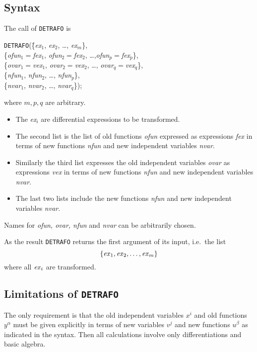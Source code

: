 \documentclass[12pt]{article}
\begin{document}
\subsection{Syntax}
The call of {\tt DETRAFO} is
\begin{tabbing}
{\tt DETRAFO}(\=\{{\it ex}$_1$, {\it ex}$_2$, \ldots , {\it ex}$_m$\}, \\
              \>\{{\it ofun}$_1=${\it fex}$_1$, {\it ofun}$_2=${\it fex}$_2$,
               \ldots ,{\it ofun}$_p=${\it fex}$_p$\},  \\
              \>\{{\it ovar}$_1=${\it vex}$_1$, {\it ovar}$_2=${\it vex}$_2$, \ldots ,
                  {\it ovar}$_q=${\it vex}$_q$\},  \\
              \>\{{\it nfun}$_1$, {\it nfun}$_2$, \ldots , {\it nfun}$_p$\},\\
              \>\{{\it nvar}$_1$, {\it nvar}$_2$, \ldots , {\it nvar}$_q$\});
\end{tabbing}     
where $m,p,q$ are arbitrary.
\begin{itemize}
\item
The {\it ex}$_i$ are differential expressions to be transformed.
\item
The second list is the list of old functions {\it ofun} expressed
as expressions {\it fex} in terms
of new functions {\it nfun} and new independent variables {\it nvar}.
\item
Similarly the third list expresses the old independent variables {\it ovar}
as expressions {\it vex} in terms of new functions
{\it nfun} and new independent variables {\it nvar}.
\item
The last two lists include the new functions {\it nfun}
and new independent variables {\it nvar}.
\end{itemize}
Names for {\it ofun, ovar, nfun} and {\it nvar} can be arbitrarily
chosen.

As the result {\tt DETRAFO} returns the first argument of its input,
i.e.\ the list
\[\{{\it ex}_1, {\it ex}_2, \ldots , {\it ex}_m\}\]
where all ${\it ex}_i$ are transformed.
\subsection{Limitations of {\tt DETRAFO}}
The only requirement is that
the old independent variables $x^i$ and old functions $y^\alpha$ must be
given explicitly in terms of new variables $v^j$ and new functions $u^\beta$
as indicated in the syntax.
Then all calculations involve only differentiations and basic algebra.
\end{document}
